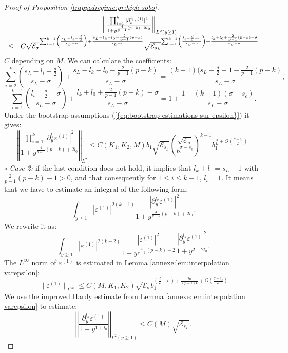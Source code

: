 \documentclass[11pt,a4paper,reqno]{amsart}
\theoremstyle{remark}
\numberwithin{equation}{section}
\begin{document}
\begin{proof}[Proof of Proposition \ref{trappedregime:pr:high sobo}]
$$\begin{array}{r c l}
&\left\Vert \frac{\prod_{i=1}^k |\partial_y^{l_i} \varepsilon^{(1)}|^2}{1+y^{\frac{4}{p-1}(p-k)+2l_0}} \right\Vert_{L^2(y\geq 1)} \\
\leq& C \sqrt{\mathcal{E}_{\sigma}}^{\sum_{i=1}^{k-1} \left(\frac{s_L-l_i-\frac{d}{2}}{s_L-\sigma}\right)+\frac{s_L-l_k-l_0-\frac{2}{p-1}(p-k)}{s_L-\sigma}} \sqrt{\mathcal{E}_{s_L}}^{\sum_{i=1}^{k-1}\left( \frac{l_i+\frac{d}{2}-\sigma}{s_L-\sigma}\right)+\frac{l_k+l_0+\frac{2}{p-1}(p-k)-\sigma}{s_L-\sigma}} 
\end{array}
$$
$C$ depending on $M$. We can calculate the coefficients:
$$
\sum_{i=2}^k \left(\frac{s_L-l_i-\frac{d}{2}}{s_L-\sigma}\right)+\frac{s_L-l_k-l_0-\frac{2}{p-1}(p-k)}{s_L-\sigma}=\frac{(k-1)(s_L-\frac{d}{2}+1-\frac{2}{p-1}(p-k)}{s_L-\sigma} ,
$$
$$
\sum_{i=1}^{k-1}\left( \frac{l_i+\frac{d}{2}-\sigma}{s_L-\sigma}\right)+\frac{l_k+l_0+\frac{2}{p-1}(p-k)-\sigma}{s_L-\sigma}=1+\frac{1-(k-1)(\sigma-s_c)}{s_L-\sigma} .
$$
Under the bootstrap assumptions {{\rm (\ref{{eq:bootstrap estimations sur epsilon}})}} it gives:
\begin{equation} \label{thetrapped:highsobo:eq:NL cas 1}
\left\Vert \frac{\prod_{i=1}^k |\partial_y^{l_i} \varepsilon^{(1)}|^2}{1+y^{\frac{4}{p-1}(p-k)+2l_0}} \right\Vert_{L^2}\leq C(K_1,K_2,M) b_1\sqrt{\mathcal{E}_{s_L}}\left( \frac{\sqrt{\mathcal{E}_{\sigma}}}{b_1^{\sigma-s_c}}\right)^{k-1}b_1^{\frac{\alpha}{L}+O\left( \frac{\sigma-s_c}{L}\right)} .
\end{equation}
$\circ$ \emph{Case 2:} if the last condition does not hold, it implies that $l_k+l_0=s_L-1$ with $\frac{2}{p-1}(p-k)-1>0$, and that consequently for $1\leq i \leq k-1$, $l_i=1$. It means that we have to estimate an integral of the following form:
$$
\int_{y\geq 1} |\varepsilon^{(1)}|^{2(k-1)}  \frac{|\partial_y^{l_k}\varepsilon^{(1)}|^2}{1+y^{\frac{4}{p-1}(p-k)+2l_0}} .
$$
We rewrite it as:
$$
\int_{y\geq 1} |\varepsilon^{(1)}|^{2(k-2)}\frac{|\varepsilon^{(1)}|^2}{1+y^{\frac{4}{p-1}(p-k)-2}}  \frac{|\partial_y^{l_k}\varepsilon^{(1)}|^2}{1+y^{2+2l_0}} .
$$
The $L^{\infty}$ norm of $\varepsilon^{(1)}$ is estimated in Lemma \ref{annexe:lem:interpolation varepsilon}:
$$
\parallel \varepsilon^{(1)} \parallel_{L^{\infty}} \leq C(M,K_1,K_2) \sqrt{\mathcal{E}_{\sigma}}b_1^{\left( \frac{d}{2}-\sigma\right)+\frac{2\alpha}{(p-1)L} +O\left( \frac{\sigma-s_c}{L} \right) } 
$$
We use the improved Hardy estimate from Lemma \ref{annexe:lem:interpolation varepsilon} to estimate:
$$
\left\Vert \frac{\partial_y^{l_k}\varepsilon^{(1)}}{1+y^{1+l_0}} \right\Vert_{L^2(y\geq 1)}\leq C(M) \sqrt{\mathcal{E}_{s_L}} .
$$
\end{proof}
\end{document}
